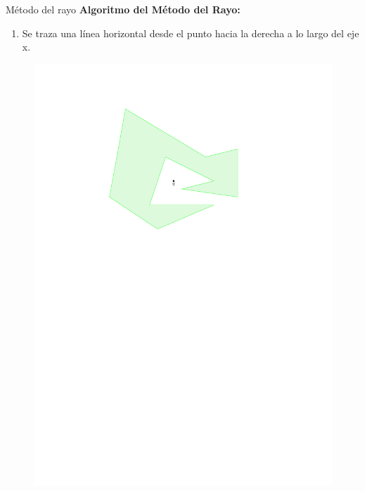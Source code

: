 \documentclass[aspectratio=169,xcolor=dvipsnames, t]{beamer}
\begin{document}
\begin{frame}[c]{Método del rayo}
  \textbf{Algoritmo del Método del Rayo:}
  \begin{enumerate}
  \item Se traza una línea horizontal desde el punto hacia la derecha a lo largo del eje x.
  \end{enumerate}
  \begin{figure}
    \centering
    \includegraphics[width=\linewidth, height=0.5\textheight, page=3, keepaspectratio]{IPE/pip.pdf}
  \end{figure}
\end{frame}
\end{document}
